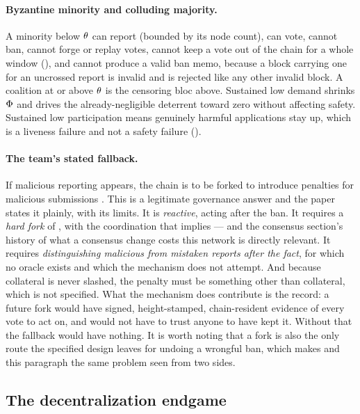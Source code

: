 \paragraph{Byzantine minority and colluding majority.} A minority below $\theta$ can report
(bounded by its node count), can vote, cannot ban, cannot forge or replay votes, cannot keep a vote
out of the chain for a whole window (), and cannot produce a valid ban memo,
because a block carrying one for an uncrossed report is invalid and is rejected like any other
invalid block. A coalition at or above $\theta$ is the censoring bloc above. Sustained low demand
shrinks $\Phi$ and drives the already-negligible \PNR{} deterrent toward zero without affecting
safety. Sustained low participation means genuinely harmful applications stay up, which is a
liveness failure and not a safety failure ().

\paragraph{The team's stated fallback.} If malicious reporting appears, the chain is to be forked to
introduce penalties for malicious submissions . This is
a legitimate governance answer and the paper states it plainly, with its limits. It is
\emph{reactive}, acting after the ban. It requires a \emph{hard fork} of \fluxd, with the
coordination that implies — and the consensus section's history of what a consensus change costs
this network is directly relevant. It requires \emph{distinguishing malicious from mistaken reports
after the fact}, for which no oracle exists and which the mechanism does not attempt. And because
collateral is never slashed, the penalty must be something other than collateral, which is not
specified. What the mechanism does contribute is the record: a future fork would have signed,
height-stamped, chain-resident evidence of every vote to act on, and would not have to trust anyone
to have kept it. Without that the fallback would have nothing. It is worth noting that a fork is
also the only route the specified design leaves for undoing a wrongful ban, which makes
 and this paragraph the same problem seen from two sides.

\subsection{The decentralization endgame}
\label{sec:23:endgame}

